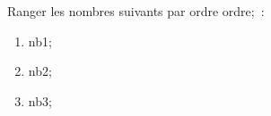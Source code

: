 \documentclass[exercice]{thedocument}%
\begin{document}
%
Ranger les nombres suivants par ordre \<ordre;~:
\begin{enumerate}
    \item \<nb1;
    \item \<nb2;
    \item \<nb3;
\end{enumerate}
\end{document}

